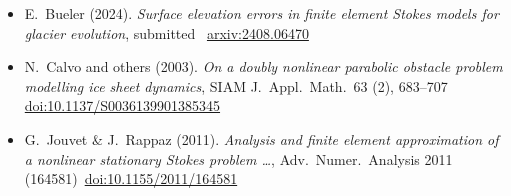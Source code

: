 
\newcommand{\sdoi}[1]{\,{\tiny \href{https://doi.org/#1}{doi:#1}}}
\begin{itemize}
\item E.~Bueler (2024). \emph{Surface elevation errors in finite element {S}tokes models for glacier evolution}, submitted \, {\tiny \href{https://arxiv.org/abs/2408.06470}{arxiv:2408.06470}}
\item N.~Calvo and others (2003). \emph{On a doubly nonlinear parabolic obstacle problem modelling ice sheet dynamics}, SIAM J.~Appl.~Math.~63 (2), 683--707 \sdoi{10.1137/S0036139901385345}
\item G.~Jouvet \& J.~Rappaz (2011). \emph{Analysis and finite element approximation of a nonlinear stationary {S}tokes problem \dots}, Adv.~Numer.~Analysis 2011 (164581) \sdoi{10.1155/2011/164581}
\end{itemize}

